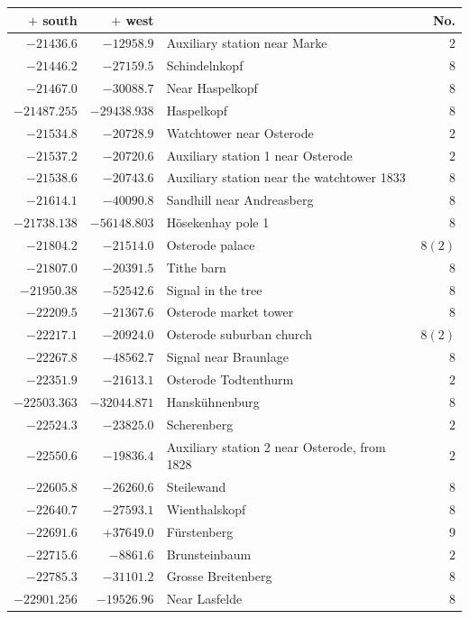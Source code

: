 \clearpage{}%
\begin{center}\begingroup\fontsize{8}{9}\selectfont
\setlength{\tabcolsep}{4pt}
\begin{tabular}{r|r|p{170pt}|r}\hline
\(+\) south&\(+\) west&&No.\\\hline
\(-21436.6\)&\(-12958.9\)&Auxiliary station near Marke&\(2\)\\
\(-21446.2\)&\(-27159.5\)&Schindelnkopf&\(8\)\\
\(-21467.0\)&\(-30088.7\)&Near Haspelkopf&\(8\)\\
\(-21487.255\)&\(-29438.938\)&Haspelkopf&\(8\)\\
\(-21534.8\)&\(-20728.9\)&Watchtower near Osterode&\(2\)\\
\(-21537.2\)&\(-20720.6\)&Auxiliary station 1 near Osterode&\(2\)\\
\(-21538.6\)&\(-20743.6\)&Auxiliary station near the watchtower 1833&\(8\)\\
\(-21614.1\)&\(-40090.8\)&Sandhill near Andreasberg&\(8\)\\
\(-21738.138\)&\(-56148.803\)&Hösekenhay pole 1&\(8\)\\
\(-21804.2\)&\(-21514.0\)&Osterode palace&\(8 (2)\)\\
\(-21807.0\)&\(-20391.5\)&Tithe barn&\(8\)\\
\(-21950.38\)&\(-52542.6\)&Signal in the tree&\(8\)\\
\(-22209.5\)&\(-21367.6\)&Osterode market tower&\(8\)\\
\(-22217.1\)&\(-20924.0\)&Osterode suburban church&\(8 (2)\)\\
\(-22267.8\)&\(-48562.7\)&Signal near Braunlage&\(8\)\\
\(-22351.9\)&\(-21613.1\)&Osterode Todtenthurm&\(2\)\\
\(-22503.363\)&\(-32044.871\)&Hanskühnenburg&\(8\)\\
\(-22524.3\)&\(-23825.0\)&Scherenberg&\(2\)\\
\(-22550.6\)&\(-19836.4\)&Auxiliary station 2 near Osterode, from 1828&\(2\)\\
\(-22605.8\)&\(-26260.6\)&Steilewand&\(8\)\\
\(-22640.7\)&\(-27593.1\)&Wienthalskopf&\(8\)\\
\(-22691.6\)&\(+37649.0\)&Fürstenberg&\(9\)\\
\(-22715.6\)&\(-8861.6\)&Brunsteinbaum&\(2\)\\
\(-22785.3\)&\(-31101.2\)&Grosse Breitenberg&\(8\)\\
\(-22901.256\)&\(-19526.96\)&Near Lasfelde&\(8\)\\

\end{tabular}
\end{center}
